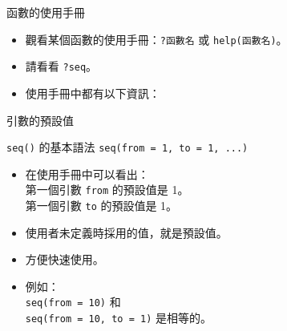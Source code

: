 \documentclass[14pt, aspectratio=43]{beamer}
\begin{document}
\begin{frame}[fragile]{函數的使用手冊}
\begin{itemize}
\item 觀看某個函數的使用手冊：\verb+?函數名+ 或 \verb+help(函數名)+。
\item 請看看 \verb+?seq+。
\item 使用手冊中都有以下資訊：
\end{itemize}
\end{frame}



\begin{frame}[fragile]{引數的預設值}

\begin{block}{\texttt{seq()} 的基本語法}
\verb+seq(from = 1, to = 1, ...)+ \\
\end{block}
\begin{itemize}
\item 在使用手冊中可以看出：
  \\ 第一個引數 \verb+from+ 的預設值是 1。
  \\ 第一個引數 \verb+to+ 的預設值是 1。
\item 使用者未定義時採用的值，就是預設值。
\item 方便快速使用。
\item 例如：\\
  \verb+seq(from = 10)+ 和 \\
  \verb+seq(from = 10, to = 1)+ 是相等的。
\end{itemize}
\end{frame}
\end{document}
